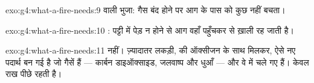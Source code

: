 \begin{solution}{exo:g4:what-a-fire-needs:9}
 वाली भुजा: गैस बंद होने पर आग के पास  को कुछ नहीं
बचता।
\end{solution}

\begin{solution}{exo:g4:what-a-fire-needs:10}
: पट्टी में पेड़ न होने से आग वहाँ पहुँचकर  से ख़ाली
रह जाती है।
\end{solution}

\begin{solution}{exo:g4:what-a-fire-needs:11}
नहीं। ज़्यादातर लकड़ी,  की ऑक्सीजन के साथ मिलकर, ऐसे नए पदार्थ बन गई
है जो गैसें हैं --- कार्बन डाइऑक्साइड, जलवाष्प और धुआँ ---
और वे  में चले गए हैं। केवल राख पीछे रहती है।
\end{solution}
